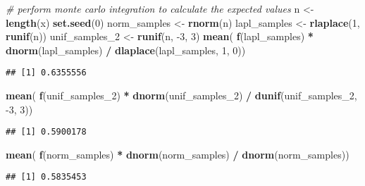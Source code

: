 \documentclass[
]{article}
\newenvironment{Shaded}{\begin{snugshade}}{\end{snugshade}}
\newcommand{\CommentTok}[1]{\textcolor[rgb]{0.56,0.35,0.01}{\textit{#1}}}
\newcommand{\DecValTok}[1]{\textcolor[rgb]{0.00,0.00,0.81}{#1}}
\newcommand{\KeywordTok}[1]{\textcolor[rgb]{0.13,0.29,0.53}{\textbf{#1}}}
\newcommand{\NormalTok}[1]{#1}
\newcommand{\OperatorTok}[1]{\textcolor[rgb]{0.81,0.36,0.00}{\textbf{#1}}}
\newcommand{\StringTok}[1]{\textcolor[rgb]{0.31,0.60,0.02}{#1}}
\begin{document}
\begin{Shaded}
\begin{Highlighting}[]
\CommentTok{# perform monte carlo integration to calculate the expected values}
\NormalTok{n <-}\StringTok{ }\KeywordTok{length}\NormalTok{(x)}
\KeywordTok{set.seed}\NormalTok{(}\DecValTok{0}\NormalTok{)}
\NormalTok{norm_samples  <-}\StringTok{ }\KeywordTok{rnorm}\NormalTok{(n)}
\NormalTok{lapl_samples <-}\StringTok{ }\KeywordTok{rlaplace}\NormalTok{(}\DecValTok{1}\NormalTok{, }\KeywordTok{runif}\NormalTok{(n))}
\NormalTok{unif_samples_}\DecValTok{2}\NormalTok{ <-}\StringTok{ }\KeywordTok{runif}\NormalTok{(n, }\DecValTok{-3}\NormalTok{, }\DecValTok{3}\NormalTok{)}
\KeywordTok{mean}\NormalTok{( }\KeywordTok{f}\NormalTok{(lapl_samples) }\OperatorTok{*}\StringTok{ }\KeywordTok{dnorm}\NormalTok{(lapl_samples) }\OperatorTok{/}\StringTok{ }\KeywordTok{dlaplace}\NormalTok{(lapl_samples, }\DecValTok{1}\NormalTok{, }\DecValTok{0}\NormalTok{))}
\end{Highlighting}
\end{Shaded}

\begin{verbatim}
## [1] 0.6355556
\end{verbatim}

\begin{Shaded}
\begin{Highlighting}[]
\KeywordTok{mean}\NormalTok{( }\KeywordTok{f}\NormalTok{(unif_samples_}\DecValTok{2}\NormalTok{) }\OperatorTok{*}\StringTok{ }\KeywordTok{dnorm}\NormalTok{(unif_samples_}\DecValTok{2}\NormalTok{) }\OperatorTok{/}\StringTok{ }\KeywordTok{dunif}\NormalTok{(unif_samples_}\DecValTok{2}\NormalTok{, }\DecValTok{-3}\NormalTok{, }\DecValTok{3}\NormalTok{))}
\end{Highlighting}
\end{Shaded}

\begin{verbatim}
## [1] 0.5900178
\end{verbatim}

\begin{Shaded}
\begin{Highlighting}[]
\KeywordTok{mean}\NormalTok{( }\KeywordTok{f}\NormalTok{(norm_samples) }\OperatorTok{*}\StringTok{ }\KeywordTok{dnorm}\NormalTok{(norm_samples) }\OperatorTok{/}\StringTok{ }\KeywordTok{dnorm}\NormalTok{(norm_samples))}
\end{Highlighting}
\end{Shaded}

\begin{verbatim}
## [1] 0.5835453
\end{verbatim}
\end{document}
